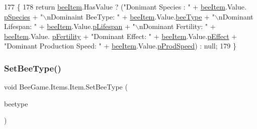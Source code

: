 \begin{DoxyCode}
177         \{
178             \textcolor{keywordflow}{return} \hyperlink{struct_bee_game_1_1_items_1_1_item_a0593f3b7b3ff5daa864f3c6d0ccd77ca}{beeItem}.HasValue ? (\textcolor{stringliteral}{"Donimant Species : "} + \hyperlink{struct_bee_game_1_1_items_1_1_item_a0593f3b7b3ff5daa864f3c6d0ccd77ca}{beeItem}.Value.
      \hyperlink{struct_bee_game_1_1_bee_1_1_bee_data_a87db9add2bcc463ab444eb4ac7a4e228}{pSpecies} + \textcolor{stringliteral}{"\(\backslash\)nDominaint BeeType: "} + \hyperlink{struct_bee_game_1_1_items_1_1_item_a0593f3b7b3ff5daa864f3c6d0ccd77ca}{beeItem}.Value.\hyperlink{struct_bee_game_1_1_bee_1_1_bee_data_acfb6e209ae7bd1b52928580fcce4c743}{beeType} + \textcolor{stringliteral}{"\(\backslash\)nDominant Lifespan: "} 
      + \hyperlink{struct_bee_game_1_1_items_1_1_item_a0593f3b7b3ff5daa864f3c6d0ccd77ca}{beeItem}.Value.\hyperlink{struct_bee_game_1_1_bee_1_1_bee_data_aa24b1efdb25e8c5592d88940f9afc1e9}{pLifespan} + \textcolor{stringliteral}{"\(\backslash\)nDominant Fertility: "} + \hyperlink{struct_bee_game_1_1_items_1_1_item_a0593f3b7b3ff5daa864f3c6d0ccd77ca}{beeItem}.Value.
      \hyperlink{struct_bee_game_1_1_bee_1_1_bee_data_a12b5a0d54c6c9162a69a88c349b044d1}{pFertility} + \textcolor{stringliteral}{"Dominant Effect: "} + \hyperlink{struct_bee_game_1_1_items_1_1_item_a0593f3b7b3ff5daa864f3c6d0ccd77ca}{beeItem}.Value.\hyperlink{struct_bee_game_1_1_bee_1_1_bee_data_a652a963fb73f2a096a001d817c0ef2be}{pEffect} + \textcolor{stringliteral}{"Dominant Production
       Speed: "} + \hyperlink{struct_bee_game_1_1_items_1_1_item_a0593f3b7b3ff5daa864f3c6d0ccd77ca}{beeItem}.Value.\hyperlink{struct_bee_game_1_1_bee_1_1_bee_data_a8fa39d271a23500ad826041b46d9feaf}{pProdSpeed}) : null;
179         \}
\end{DoxyCode}
\mbox{\label{struct_bee_game_1_1_items_1_1_item_a80c66aa30f64c498640a4b0ba1ec37b0}} 
\subsubsection{\texorpdfstring{Set\+Bee\+Type()}{SetBeeType()}}
{\footnotesize\ttfamily void Bee\+Game.\+Items.\+Item.\+Set\+Bee\+Type (\begin{DoxyParamCaption}\item[{\hyperlink{namespace_bee_game_1_1_enums_a9376a1582db99d20c756e24de728944f}{Bee\+Type}}]{beetype }\end{DoxyParamCaption})}




